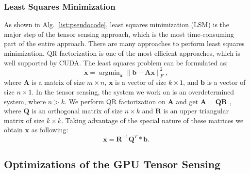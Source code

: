 \documentclass[futureinternet,article,submit,moreauthors,pdftex,10pt,a4paper]{Definitions/mdpi}
\theoremstyle{plain}
\theoremstyle{definition}
\theoremstyle{remark}
\begin{document}
\subsubsection{Least Squares Minimization}
As shown in Alg. \ref{list:pseudocode}, least squares minimization (LSM) is the major step of the tensor sensing approach, which is the most time-consuming part of the entire approach. There are many approaches to perform least squares minimization. QR factorization is one of the most efficient approaches, which is well supported by CUDA. The least squares problem can be formulated as:
\begin{equation}
\widetilde{\mathbf{x}} = \mathop{\arg \min}_{\mathbf{x}} \| \mathbf{b} - \mathbf{A} \mathbf{x} \|^2_F,
\end{equation}
where $\mathbf{A}$ is a matrix of size $m \times n$, $\mathbf{x}$ is a vector
of size $k \times 1$, and $\mathbf{b}$ is a vector of size $n \times 1$. In the tensor
sensing, the system we work on is an overdetermined system, where $n >
 k$.
 We perform QR factorization on $\mathbf{A}$ and get $\mathbf{A} = \mathbf{Q}\mathbf{R}$ , where $\mathbf{Q}$ is an
 orthogonal matrix of size $n \times k $ and $\mathbf{R}$ is an upper triangular matrix of size $k \times k$. Taking advantage of the special nature of these matrices we obtain $\mathbf{x}$
as following:
\begin{equation}
\mathbf{x} = \mathbf{R}^{-1}\mathbf{Q}^{T} \ast \mathbf{b}.
\end{equation}

\subsection{Optimizations of the GPU Tensor Sensing}
\label{SEC_OPT}
\end{document}
